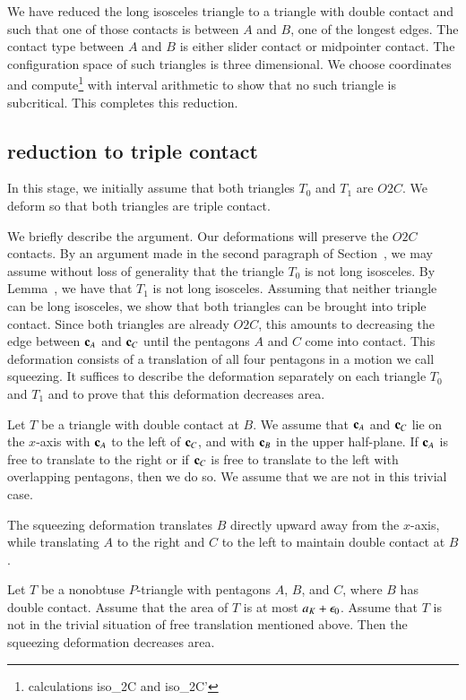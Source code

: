 We have reduced the long isosceles triangle to a triangle with double contact and such that one of those contacts is between $A$ and $B$, one of the
longest edges.  The contact type between $A$ and $B$ is either slider contact or midpointer contact.  The configuration space of such triangles is
three dimensional.  We choose coordinates and compute\footnote{calculations iso\_2C and iso\_2C'} 
with interval arithmetic to show that no such triangle is subcritical.  This completes this reduction.

\subsection{reduction to triple contact}

In this stage, we initially assume that both triangles $T_0$ and $T_1$ are $O2C$.
We deform so that both triangles are triple contact.

We briefly describe the argument.   Our deformations will preserve the $O2C$ contacts.  By an argument made in the second paragraph of Section~,
we may assume without loss of generality that the triangle $T_0$ is not long isosceles.   By Lemma~, we have that $T_1$ is not long
isosceles.
Assuming that neither triangle can be long isosceles,
 we show that both triangles can be brought into triple contact.  Since both triangles are already $O2C$, this amounts
to decreasing the edge between ${\mathbf c}_A$ and ${\mathbf c}_C$ until the pentagons $A$ and $C$ come into contact.
This deformation consists of a translation of all four pentagons in a motion we call squeezing.  It suffices to describe the deformation separately on
each triangle $T_0$ and $T_1$ and to prove that this deformation decreases area.  

Let $T$ be a triangle with double contact at $B$.  We assume that ${\mathbf c}_A$ and ${\mathbf c}_C$ lie on the $x$-axis with ${\mathbf c}_A$ to the left of ${\mathbf c}_C$, and
with ${\mathbf c}_B$ in the upper half-plane.
If ${\mathbf c}_A$ is free to translate to the right or if ${\mathbf c}_C$ is free to translate to the left with overlapping pentagons, then we do so.  We assume that
we are not in this trivial case.

The squeezing deformation translates $B$ directly upward away from the $x$-axis, while translating $A$ to the right and $C$ to the left to maintain
double contact at $B$.  

\begin{lemma}  Let $T$ be a nonobtuse $P$-triangle with pentagons $A$, $B$, and $C$, where $B$ has double contact.
Assume that the  area of $T$ is at most $a_K+\epsilon_0$.  Assume that $T$ is not in the trivial situation of free translation mentioned above.
Then the squeezing deformation decreases area.
\end{lemma}

